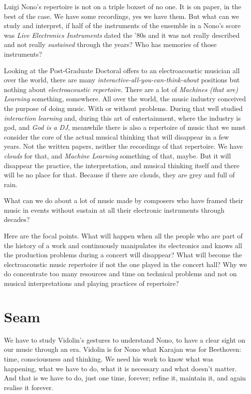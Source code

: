 \documentclass[twoside,a4paper]{article}
\begin{document}
Luigi Nono's repertoire is not on a triple boxset of no one. It is on paper, in the best of the case. We have some recordings, yes we have them. But what can we study and interpret, if half of the instruments of the ensemble in a Nono's score was \emph{Live Electronics Instruments} dated the '80s and it was not really described and not really \emph{sustained} through the years? Who has memories of those instruments?

Looking at the Post-Graduate Doctoral offers to an electroacoustic musician all over the world, there are many \emph{interactive-all-you-can-think-about} positions but nothing about \emph{electroacoustic repertoire}. There are a lot of \emph{Machines (that are) Learning} something, somewhere. All over the world, the music industry conceived the purpose of doing music. With or without problems. During that well studied \emph{interaction learning} and, during this art of entertainment, where the industry is god, and \emph{God is a DJ}, meanwhile there is also a repertoire of music that we must consider the core of the actual musical thinking that will disappear in a few years. Not the written papers, neither the recordings of that repertoire. We have \emph{clouds} for that, and \emph{Machine Learning} something of that, maybe. But it will disappear the practice, the interpretation, and musical thinking itself and there will be no place for that. Because if there are clouds, they are grey and full of rain.

What can we do about a lot of music made by composers who have framed their music in events without sustain at all their electronic instruments through decades?

Here are the focal points. What will happen when all the people who are part of the history of a work and continuously manipulates its electronics and knows all the production problems during a concert will disappear? What will become the electroacoustic music repertoire if not the one played in the concert hall? Why we do concentrate too many resources and time on technical problems and not on musical interpretations and playing practices of repertoire?

\section{Seam}
\label{sec:seam}

We have to study Vidolin's gestures to understand Nono, to have a clear sight on our music through an era. Vidolin is for Nono what Karajan was for Beethoven: time, consciousness and thinking. We need his work to know what was happening, what we have to do, what it is necessary and what doesn't matter. And that is we have to do, just one time, forever; refine it, maintain it, and again realise it forever.
\end{document}
